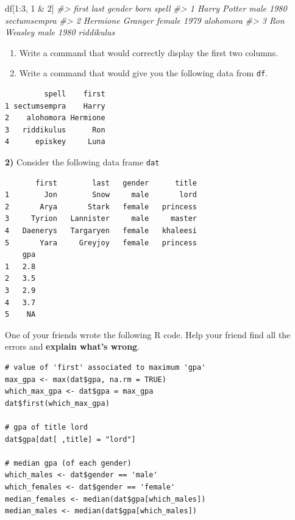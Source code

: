 \documentclass[
]{book}
\newenvironment{Shaded}{\begin{snugshade}}{\end{snugshade}}
\newcommand{\CommentTok}[1]{\textcolor[rgb]{0.56,0.35,0.01}{\textit{#1}}}
\newcommand{\DecValTok}[1]{\textcolor[rgb]{0.00,0.00,0.81}{#1}}
\newcommand{\NormalTok}[1]{#1}
\newcommand{\SpecialCharTok}[1]{\textcolor[rgb]{0.00,0.00,0.00}{#1}}
\begin{document}
\begin{Shaded}
\begin{Highlighting}[]
\NormalTok{df[}\DecValTok{1}\SpecialCharTok{:}\DecValTok{3}\NormalTok{, }\DecValTok{1} \SpecialCharTok{\&} \DecValTok{2}\NormalTok{]}
\CommentTok{\#\textgreater{}      first    last gender born        spell}
\CommentTok{\#\textgreater{} 1    Harry  Potter   male 1980 sectumsempra}
\CommentTok{\#\textgreater{} 2 Hermione Granger female 1979    alohomora}
\CommentTok{\#\textgreater{} 3      Ron Weasley   male 1980   riddikulus}
\end{Highlighting}
\end{Shaded}

\begin{enumerate}
\def\labelenumi{\alph{enumi})}
\setcounter{enumi}{3}
\item
  Write a command that would correctly display the first two columns.
\item
  Write a command that would give you the following data from \texttt{df}.
\end{enumerate}

\begin{verbatim}
         spell    first
1 sectumsempra    Harry
2    alohomora Hermione
3   riddikulus      Ron
4      episkey     Luna
\end{verbatim}

\textbf{2)} Consider the following data frame \texttt{dat}

\begin{verbatim}
       first        last   gender      title
1        Jon        Snow     male       lord
2       Arya       Stark   female   princess
3     Tyrion   Lannister     male     master
4   Daenerys   Targaryen   female   khaleesi
5       Yara     Greyjoy   female   princess
    gpa
1   2.8
2   3.5
3   2.9
4   3.7
5    NA
\end{verbatim}

One of your friends wrote the following R code. Help your friend find all the
errors and \textbf{explain what's wrong}.

\begin{verbatim}
# value of 'first' associated to maximum 'gpa'
max_gpa <- max(dat$gpa, na.rm = TRUE)
which_max_gpa <- dat$gpa = max_gpa
dat$first(which_max_gpa)

# gpa of title lord
dat$gpa[dat[ ,title] = "lord"]

# median gpa (of each gender)
which_males <- dat$gender == 'male'
which_females <- dat$gender == 'female'
median_females <- median(dat$gpa[which_males])
median_males <- median(dat$gpa[which_males])
\end{verbatim}
\end{document}
